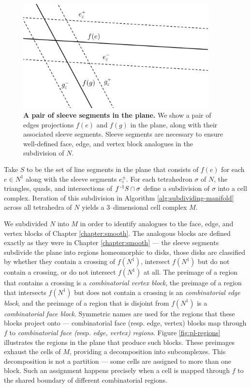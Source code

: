 \begin{figure}[h!]
	\centering
	\includegraphics[width=0.9\textwidth]{figures/pl-sleeves.png}
	\caption{
		\textbf{A pair of sleeve segments in the plane.}
		We show a pair of edges projections $f(e)$ and $f(g)$ in the plane, along with their associated sleeve segments.
		Sleeve segments are necessary to ensure well-defined face, edge, and vertex block analogues in the subdivision of $N$.
	}
	\label{fig:pl-sleeves}
\end{figure}

Take $S$ to be the set of line segments in the plane that consists of $f(e)$ for each $e\in N^1$ along with the sleeve segments $e_\varepsilon^\pm$.
For each tetrahedron $\sigma$ of $N$, the triangles, quads, and intersections of $f^{\,\text{-}1} S\cap\sigma$ define a subdivision of $\sigma$ into a cell complex.
Iteration of this subdivision in Algorithm \ref{alg:subdividing-manifold} across all tetrahedra of $N$ yields a 3--dimensional cell complex $M$.

We subdivided $N$ into $M$ in order to identify analogues to the face, edge, and vertex blocks of Chapter \ref{chapter:smooth}.
The analogous blocks are defined exactly as they were in Chapter \ref{chapter:smooth} --- the sleeve segments subdivide the plane into regions homeomorphic to disks, those disks are classified by whether they contain a crossing of $f(N^1)$, intersect $f(N^1)$ but do not contain a crossing, or do not intersect $f(N^1)$ at all.
The preimage of a region that contains a crossing is a \emph{combinatorial vertex block}, the preimage of a region that intersects $f(N^1)$ but does not contain a crossing is an \emph{combinatorial edge block}, and the preimage of a region that is disjoint from $f(N^1)$ is a \emph{combinatorial face block}.
Symmetric names are used for the regions that these blocks project onto --- combinatorial face (resp. edge, vertex) blocks map through $f$ to \emph{combinatorial face (}resp. \emph{edge, vertex) regions}.
Figure \ref{fig:pl-regions} illustrates the regions in the plane that produce such blocks.
These preimages exhaust the cells of $M$, providing a decomposition into subcomplexes.
This decomposition is not a partition --- some cells are assigned to more than one block.
Such an assignment happens precisely when a cell is mapped through $f$ to the shared boundary of different combinatorial regions.

